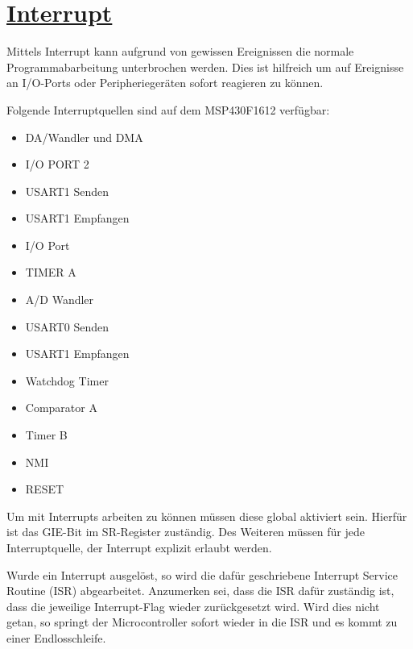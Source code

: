 \documentclass[11pt,german]{scrartcl}
\begin{document}

\clearpage
\section*
{\href{http://cst.mi.fu-berlin.de/intern/19606-P-MPP/Aufgaben/040400.html}
{Interrupt}}

Mittels Interrupt kann aufgrund von gewissen Ereignissen die normale Programmabarbeitung unterbrochen werden.
Dies ist hilfreich um auf Ereignisse an I/O-Ports oder Peripheriegeräten sofort reagieren zu können.

Folgende Interruptquellen sind auf dem MSP430F1612 verfügbar:

\begin{itemize}
    \item DA/Wandler und DMA
    \item I/O PORT 2
    \item USART1 Senden
    \item USART1 Empfangen
    \item I/O Port
    \item TIMER A
    \item A/D Wandler
    \item USART0 Senden
    \item USART1 Empfangen
    \item Watchdog Timer
    \item Comparator A
    \item Timer B
    \item NMI
    \item RESET
\end{itemize}

Um mit Interrupts arbeiten zu können müssen diese global aktiviert sein.
Hierfür ist das GIE-Bit im SR-Register zuständig.
Des Weiteren müssen für jede Interruptquelle, der Interrupt explizit erlaubt werden.

Wurde ein Interrupt ausgelöst, so wird die dafür geschriebene Interrupt Service Routine (ISR) abgearbeitet. Anzumerken sei, dass die ISR dafür zuständig ist, dass die jeweilige Interrupt-Flag wieder zurückgesetzt wird.
Wird dies nicht getan, so springt der Microcontroller sofort wieder in die ISR und es kommt zu einer Endlosschleife.




\end{document}
